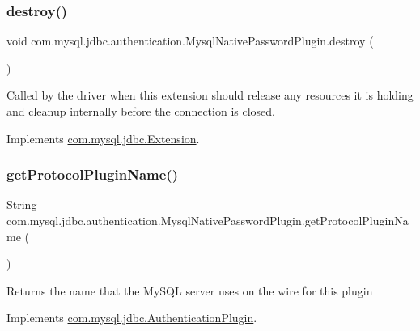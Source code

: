 \subsubsection{\texorpdfstring{destroy()}{destroy()}}
{\footnotesize\ttfamily void com.\+mysql.\+jdbc.\+authentication.\+Mysql\+Native\+Password\+Plugin.\+destroy (\begin{DoxyParamCaption}{ }\end{DoxyParamCaption})}

Called by the driver when this extension should release any resources it is holding and cleanup internally before the connection is closed. 

Implements \mbox{\hyperlink{interfacecom_1_1mysql_1_1jdbc_1_1_extension_a7d9644de305efed5df71f3fcc7cc1772}{com.\+mysql.\+jdbc.\+Extension}}.

\mbox{\label{classcom_1_1mysql_1_1jdbc_1_1authentication_1_1_mysql_native_password_plugin_a864fdbd1fc6282bfdf04805cd059d46b}} 
\subsubsection{\texorpdfstring{get\+Protocol\+Plugin\+Name()}{getProtocolPluginName()}}
{\footnotesize\ttfamily String com.\+mysql.\+jdbc.\+authentication.\+Mysql\+Native\+Password\+Plugin.\+get\+Protocol\+Plugin\+Name (\begin{DoxyParamCaption}{ }\end{DoxyParamCaption})}

Returns the name that the My\+S\+QL server uses on the wire for this plugin 

Implements \mbox{\hyperlink{interfacecom_1_1mysql_1_1jdbc_1_1_authentication_plugin_a90dfb5c717939a248527c5bdf512b510}{com.\+mysql.\+jdbc.\+Authentication\+Plugin}}.

\mbox{\label{classcom_1_1mysql_1_1jdbc_1_1authentication_1_1_mysql_native_password_plugin_a83b8e09be039f698b142aa365daf1de6}} 
